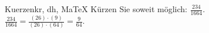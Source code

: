\begin{MAufgabe}{Kuerzen}{kr, dh, MaTeX}
K\"urzen Sie soweit m\"oglich: $\frac{234}{1664}$.\\ 
\ifLsg\MLoesung
\quad $\frac{234}{1664}=\frac{(26)\cdot(9)}{(26)\cdot(64)}=\frac{9}{64}$.\else\relax\fi
 \end{MAufgabe}